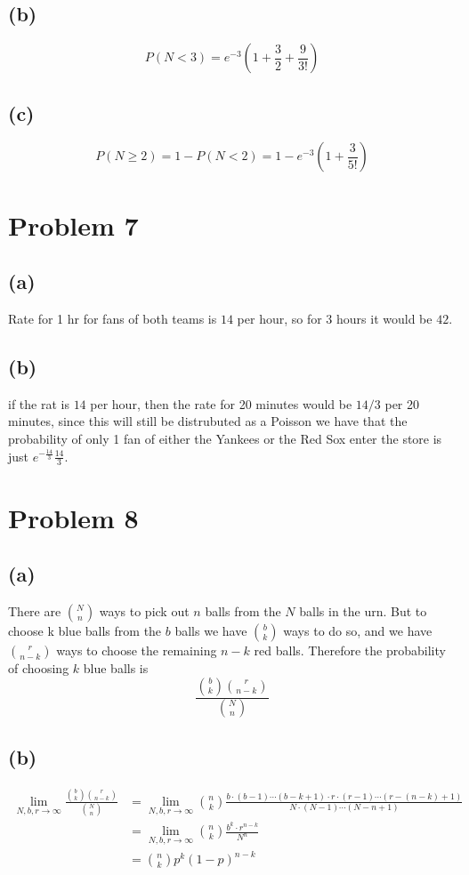 \subsection*{(b)}
$$P(N<3)=e^{-3}\left(1+\frac{3}{2}+\frac{9}{3!}\right)$$
\subsection*{(c)}
$$P(N\geq 2)=1-P(N<2)=\boxed{1-e^{-3}\left(1+\frac{3}{5!}\right)}$$
\section*{Problem 7}
\subsection*{(a)}
Rate for 1 hr for fans of both teams is $14$ per hour,
so for 3 hours it would be $\boxed{42}$.
\subsection*{(b)}
if the rat is $14$ per hour, then the rate for 
20 minutes would be $14/3$ per 20 minutes, since this will
still be distrubuted as a Poisson we have that the probability 
of only 1 fan of either the Yankees or the Red Sox enter the store
is just $\boxed{e^{-\frac{14}{3}}\frac{14}{3}}$.
\section*{Problem 8}
\subsection*{(a)}
There are $N\choose n$ ways to pick out $n$ balls from the $N$
balls in the urn. But to choose k blue balls from the $b$ balls
we have $b\choose k$ ways to do so, and we have 
$r\choose n-k$ ways to choose the remaining $n-k$ red balls. Therefore the 
probability of choosing $k$ blue balls is
$$\boxed{\frac{{b\choose k}{r \choose n-k}}{{N\choose n}}}$$
\subsection*{(b)}
\begin{align*}
    \lim_{N,b,r\to \infty}\frac{{b\choose k}{r \choose n-k}}{{N\choose n}}&=
        \lim_{N,b,r\to \infty}{n\choose k}\frac{b\cdot(b-1)\cdots (b-k+1)\cdot r\cdot (r-1)\cdots (r-(n-k)+1)}{N\cdot (N-1)\cdots (N-n+1)}\\
        &=\lim_{N,b,r\to \infty}{n\choose k}\frac{b^k\cdot r^{n-k}}{N^n}\\
        &={n\choose k}p^k(1-p)^{n-k}
\end{align*}

